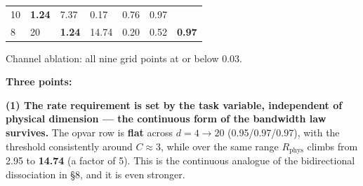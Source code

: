 \documentclass[11pt]{article}
\begin{document}
\begin{longtable}[]{@{}lllllll@{}}
\begin{minipage}[t]{0.12\columnwidth}
10\strut
\end{minipage} & \begin{minipage}[t]{0.12\columnwidth}\raggedright
\textbf{1.24}\strut
\end{minipage} & \begin{minipage}[t]{0.12\columnwidth}\raggedright
7.37\strut
\end{minipage} & \begin{minipage}[t]{0.12\columnwidth}\raggedright
0.17\strut
\end{minipage} & \begin{minipage}[t]{0.12\columnwidth}\raggedright
0.76\strut
\end{minipage} & \begin{minipage}[t]{0.12\columnwidth}\raggedright
0.97\strut
\end{minipage}\tabularnewline
\begin{minipage}[t]{0.12\columnwidth}\raggedright
8\strut
\end{minipage} & \begin{minipage}[t]{0.12\columnwidth}\raggedright
20\strut
\end{minipage} & \begin{minipage}[t]{0.12\columnwidth}\raggedright
\textbf{1.24}\strut
\end{minipage} & \begin{minipage}[t]{0.12\columnwidth}\raggedright
14.74\strut
\end{minipage} & \begin{minipage}[t]{0.12\columnwidth}\raggedright
0.20\strut
\end{minipage} & \begin{minipage}[t]{0.12\columnwidth}\raggedright
0.52\strut
\end{minipage} & \begin{minipage}[t]{0.12\columnwidth}\raggedright
\textbf{0.97}\strut
\end{minipage}\tabularnewline
\bottomrule
\end{longtable}

Channel ablation: all nine grid points at or below 0.03.

\textbf{Three points:}

\textbf{(1) The rate requirement is set by the task variable, independent of physical dimension --- the continuous form of the bandwidth law survives.}
The opvar row is \textbf{flat} across \(d=4\to20\) (0.95/0.97/0.97), with the threshold consistently around \(C\approx3\), while over the same range \(R_{\text{phys}}\) climbs from 2.95 to \textbf{14.74} (a factor of 5). This is the continuous analogue of the bidirectional dissociation in \S{}8, and it is even stronger.
\end{document}
